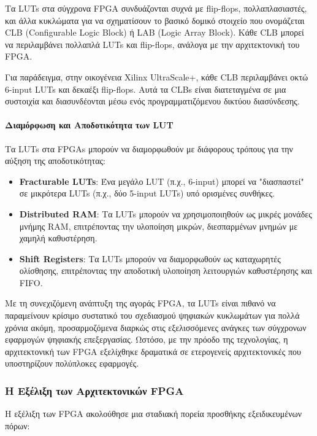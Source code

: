 Τα LUTs στα σύγχρονα FPGA συνδυάζονται συχνά με flip-flops, πολλαπλασιαστές, και άλλα κυκλώματα για να σχηματίσουν το βασικό δομικό στοιχείο που ονομάζεται CLB (Configurable Logic Block) ή LAB (Logic Array Block). Κάθε CLB μπορεί να περιλαμβάνει πολλαπλά LUTs και flip-flops, ανάλογα με την αρχιτεκτονική του FPGA.

Για παράδειγμα, στην οικογένεια Xilinx UltraScale+, κάθε CLB περιλαμβάνει οκτώ 6-input LUTs και δεκαέξι flip-flops. Αυτά τα CLBs είναι διατεταγμένα σε μια συστοιχία και διασυνδέονται μέσω ενός προγραμματιζόμενου δικτύου διασύνδεσης.

\paragraph{Διαμόρφωση και Αποδοτικότητα των LUT}
Τα LUTs στα FPGAs μπορούν να διαμορφωθούν με διάφορους τρόπους για την αύξηση της αποδοτικότητας:

\begin{itemize}
  \item \textbf{Fracturable LUTs}: Ένα μεγάλο LUT (π.χ., 6-input) μπορεί να "διασπαστεί" σε μικρότερα LUTs (π.χ., δύο 5-input LUTs) υπό ορισμένες συνθήκες.
  
  \item \textbf{Distributed RAM}: Τα LUTs μπορούν να χρησιμοποιηθούν ως μικρές μονάδες μνήμης RAM, επιτρέποντας την υλοποίηση μικρών, διεσπαρμένων μνημών με χαμηλή καθυστέρηση.
  
  \item \textbf{Shift Registers}: Τα LUTs μπορούν να διαμορφωθούν ως καταχωρητές ολίσθησης, επιτρέποντας την αποδοτική υλοποίηση λειτουργιών καθυστέρησης και FIFO.
\end{itemize}

Με τη συνεχιζόμενη ανάπτυξη της αγοράς FPGA, τα LUTs είναι πιθανό να παραμείνουν κρίσιμο συστατικό του σχεδιασμού ψηφιακών κυκλωμάτων για πολλά χρόνια ακόμη, προσαρμοζόμενα διαρκώς στις εξελισσόμενες ανάγκες των σύγχρονων εφαρμογών ψηφιακής επεξεργασίας.
Ωστόσο, με την πρόοδο της τεχνολογίας, η αρχιτεκτονική των FPGA εξελίχθηκε δραματικά σε ετερογενείς αρχιτεκτονικές που υποστηρίζουν πολύπλοκες εφαρμογές.

\subsubsection{Η Εξέλιξη των Αρχιτεκτονικών FPGA}

Η εξέλιξη των FPGA ακολούθησε μια σταδιακή πορεία προσθήκης εξειδικευμένων πόρων:


